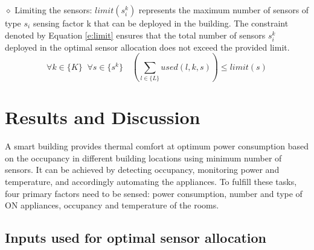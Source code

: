 \documentclass{article}
\begin{document}
\noindent $\diamond$ Limiting the sensors: $limit(s_i^k)$ represents the maximum number of sensors of type $s_i$ sensing factor k that can be deployed in the building.
The constraint denoted by Equation \eqref{e:limit} ensures that the total number of sensors $s_i^k$ deployed in the optimal sensor allocation does not exceed the provided limit.
\begin{equation}
\label{e:limit}
\forall k \in \{K\} \;\; \forall s \in \{s^k\} \quad \left(
\sum_{l \in \{L\}} used(l,k,s)
\right) \leq limit(s)
\end{equation}


\section{Results and Discussion}

A smart building provides thermal comfort at optimum power consumption based on the occupancy in different building locations using minimum number of sensors. 
It can be achieved by detecting occupancy, monitoring power and temperature, and accordingly automating the appliances.
To fulfill these tasks, four primary factors need to be sensed: power consumption, number and type of ON appliances, occupancy and temperature of the rooms.

\subsection{Inputs used for optimal sensor allocation}
\end{document}

